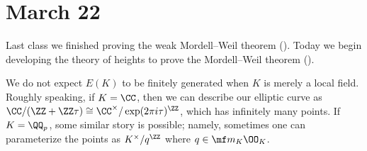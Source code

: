 \documentclass[../notes.tex]{subfiles}
\begin{document}
\section{March 22}

Last class we finished proving the weak Mordell--Weil theorem (). Today we begin developing the theory of heights to prove the Mordell--Weil theorem ().
\begin{remark}
	We do not expect $E(K)$ to be finitely generated when $K$ is merely a local field. Roughly speaking, if $K=\CC$, then we can describe our elliptic curve as $\CC/(\ZZ+\ZZ\tau)\cong\CC^\times/\exp(2\pi i\tau)^\ZZ$, which has infinitely many points. If $K=\QQ_p$, some similar story is possible; namely, sometimes one can parameterize the points as $K^\times/q^\ZZ$ where $q\in\mf m_K\OO_K$.
\end{remark}
\end{document}
